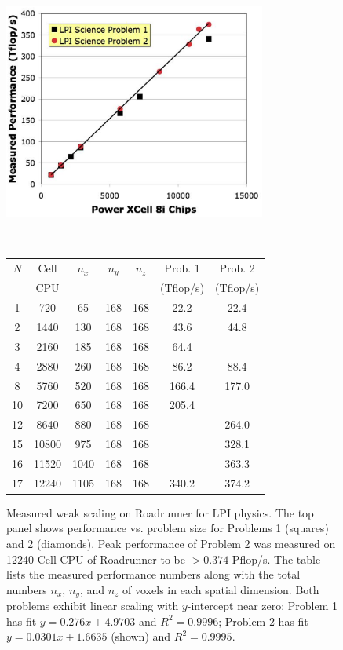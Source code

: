 \documentclass[journal,twoside]{IEEEtran}
\begin{document}
\begin{figure}
\begin{center}
\includegraphics[width=3.4in]{figs/weak_scaling.eps}

\

\begin{tabular}{ccccccc}
\hline
\hline
$N$ & Cell & $n_x$ & $n_y$ & $n_z$ & Prob. 1 & Prob. 2  \\
   & CPU        &        & &            & (Tflop/s) & (Tflop/s) \\
\hline
1  &  720  &  65  & 168 & 168  &  22.2 &  22.4 \\ 
2  & 1440  & 130  & 168 & 168  &  43.6 &  44.8 \\
3  & 2160  & 185  & 168 & 168  &  64.4 &       \\
4  & 2880  & 260  & 168 & 168  &  86.2 &  88.4 \\
8  & 5760  & 520  & 168 & 168  & 166.4 & 177.0 \\
10 & 7200  & 650  & 168 & 168  & 205.4 &       \\
12 & 8640  & 880  & 168 & 168  &       & 264.0 \\
15 & 10800 & 975  & 168 & 168  &       & 328.1 \\
16 & 11520 & 1040 & 168 & 168  &       & 363.3 \\
17 & 12240 & 1105 & 168 & 168  & 340.2 & 374.2 \\
\hline
\end{tabular}

\caption{Measured weak scaling on Roadrunner for LPI physics. 
The top panel shows performance vs. problem size for Problems 1 (squares)
and 2 (diamonds). Peak performance of Problem 2 was measured  on 12240 Cell CPU
of Roadrunner to be $>0.374$ Pflop/s.  The table lists the 
measured performance numbers along with the total numbers $n_x$, $n_y$, and $n_z$ of 
voxels in each spatial dimension.  Both problems exhibit linear scaling 
with $y$-intercept near zero:  Problem 1 has fit $y=0.276x + 4.9703$ and
$R^2=0.9996$; Problem 2 has fit $y=0.0301x + 1.6635$ (shown) 
and $R^2 = 0.9995$.}
\label{fig:weakscaling}
\end{center}
\end{figure}
\end{document}
